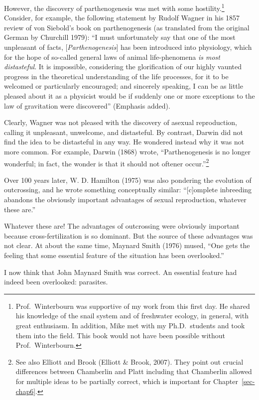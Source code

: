 \documentclass[
  letterpaper,
]{book}
\begin{document}
However, the discovery of parthenogenesis was met with some
hostility.\footnote{Prof.~Winterbourn was supportive of my work from
  this first day. He shared his knowledge of the snail system and of
  freshwater ecology, in general, with great enthusiasm. In addition,
  Mike met with my Ph.D.~students and took them into the field. This
  book would not have been possible without Prof.~Winterbourn.}
Consider, for example, the following statement by Rudolf Wagner in his
1857 review of von Siebold's book on parthenogenesis (as translated from
the original German by Churchill 1979): ``I must unfortunately say that
one of the most unpleasant of facts, {[}\emph{Parthenogenesis}{]} has
been introduced into physiology, which for the hope of so-called general
laws of animal life-phenomena \emph{is most distasteful}. It is
impossible, considering the glorification of our highly vaunted progress
in the theoretical understanding of the life processes, for it to be
welcomed or particularly encouraged; and sincerely speaking, I can be as
little pleased about it as a physicist would be if suddenly one or more
exceptions to the law of gravitation were discovered'' (Emphasis added).

Clearly, Wagner was not pleased with the discovery of asexual
reproduction, calling it unpleasant, unwelcome, and distasteful. By
contrast, Darwin did not find the idea to be distasteful in any way. He
wondered instead why it was not more common. For example, Darwin (1868)
wrote, ``Parthenogenesis is no longer wonderful; in fact, the wonder is
that it should not oftener occur.''\footnote{See also Elliott and Brook
  (Elliott \& Brook, 2007). They point out crucial differences between
  Chamberlin and Platt including that Chamberlin allowed for multiple
  ideas to be partially correct, which is important for
  Chapter~\ref{sec-chap6}.}

Over 100 years later, W. D. Hamilton (1975) was also pondering the
evolution of outcrossing, and he wrote something conceptually similar:
``{[}c{]}omplete inbreeding abandons the obviously important advantages
of sexual reproduction, whatever these are.''

Whatever these are! The advantages of outcrossing were obviously
important because cross-fertilization is so dominant. But the source of
these advantages was not clear. At about the same time, Maynard Smith
(1976) mused, ``One gets the feeling that some essential feature of the
situation has been overlooked.''

I now think that John Maynard Smith was correct. An essential feature
had indeed been overlooked: parasites.
\end{document}
